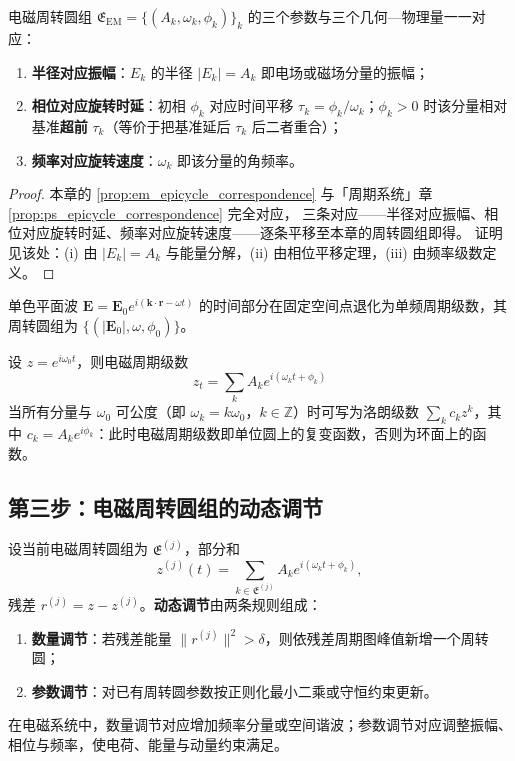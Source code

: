 \begin{proposition}\label{prop:em_epicycle_correspondence}
电磁周转圆组 $\mathfrak E_{\mathrm{EM}}=\{(A_k,\omega_k,\phi_k)\}_{k}$ 的三个参数与三个几何—物理量一一对应：
\begin{enumerate}[label=(\roman*)]
    \item \textbf{半径对应振幅}：$E_k$ 的半径 $|E_k|=A_k$ 即电场或磁场分量的振幅；
    \item \textbf{相位对应旋转时延}：初相 $\phi_k$ 对应时间平移 $\tau_k=\phi_k/\omega_k$；$\phi_k>0$ 时该分量相对基准\textbf{超前} $\tau_k$（等价于把基准延后 $\tau_k$ 后二者重合）；
    \item \textbf{频率对应旋转速度}：$\omega_k$ 即该分量的角频率。
\end{enumerate}
\end{proposition}

\begin{proof}
本章的 \cref{prop:em_epicycle_correspondence} 与「周期系统」章 \cref{prop:ps_epicycle_correspondence} 完全对应，
三条对应——半径对应振幅、相位对应旋转时延、频率对应旋转速度——逐条平移至本章的周转圆组即得。
证明见该处：(i) 由 $|E_k|=A_k$ 与能量分解，(ii) 由相位平移定理，(iii) 由频率级数定义。
\end{proof}

\begin{example}[平面波周期级数]\label{ex:em_plane_wave_series}
单色平面波 $\mathbf E=\mathbf E_0e^{i(\mathbf k\cdot\mathbf r-\omega t)}$ 的时间部分在固定空间点退化为单频周期级数，其周转圆组为 $\{(|\mathbf E_0|,\omega,\phi_0)\}$。
\end{example}

\begin{remark}[周期级数即复变函数]\label{rem:em_series_complex}
设 $z=e^{i\omega_0t}$，则电磁周期级数
\[
z_t=\sum_k A_k e^{i(\omega_k t+\phi_k)}
\]
当所有分量与 $\omega_0$ 可公度（即 $\omega_k=k\omega_0$，$k\in\mathbb Z$）时可写为洛朗级数 $\sum_k c_k z^k$，其中 $c_k=A_k e^{i\phi_k}$：此时电磁周期级数即单位圆上的复变函数，否则为环面上的函数。
\end{remark}

\subsection{第三步：电磁周转圆组的动态调节}

\begin{definition}[电磁周转圆组的动态调节]\label{def:em_adaptive_adjustment}
设当前电磁周转圆组为 $\mathfrak E^{(j)}$，部分和
\[
z^{(j)}(t)=\sum_{k\in\mathfrak E^{(j)}}A_k e^{i(\omega_k t+\phi_k)},
\]
残差 $r^{(j)}=z-z^{(j)}$。\textbf{动态调节}由两条规则组成：
\begin{enumerate}[label=(\roman*)]
    \item \textbf{数量调节}：若残差能量 $\|r^{(j)}\|^2>\delta$，则依残差周期图峰值新增一个周转圆；
    \item \textbf{参数调节}：对已有周转圆参数按正则化最小二乘或守恒约束更新。
\end{enumerate}
在电磁系统中，数量调节对应增加频率分量或空间谐波；参数调节对应调整振幅、相位与频率，使电荷、能量与动量约束满足。
\end{definition}

